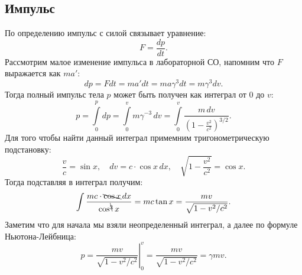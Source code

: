\subsection{Импульс}
По определению импульс с силой связывает уравнение:
\begin{equation*}
	F = \frac{dp}{dt}.
\end{equation*}
Рассмотрим малое изменение импульса в лабораторной СО, напомним что $F$ выражается как $ma'$:
\begin{equation*}
	dp = F dt = m a' dt = m a \gamma^{3} dt = m \gamma^{3} dv.
\end{equation*}
Тогда полный импульс тела $p$ может быть получен как интеграл от 0 до $v$:
\begin{equation*}
	p = \int\limits_0^{p} dp = \int\limits_0^{v} m \gamma^{-3} \,dv = \int\limits_0^{v} \frac{m \, dv}{\left(1 - \frac{v^2}{c^2}\right)^{3/2}}.
\end{equation*}
Для того чтобы найти данный интеграл примемним тригонометрическую подстановку:
\begin{equation}
	\frac{v}{c} = \sin x, \quad dv = c \cdot \cos x \, dx, \quad \sqrt{1-\frac{v^2}{c^2}} = \cos x.
	\label{eq:sr-imp-trigsub}
\end{equation}
Тогда подставляя в интеграл получим:
\begin{equation*}
	\int\limits \frac{mc \cdot \bcancel{\cos x} \, dx}{\cos^{\bcancel{3}} x} = mc \tan x = \frac{mv}{\sqrt{1-v^2/c^2}}.
\end{equation*}
Заметим что для начала мы взяли неопределенный интеграл, а далее по формуле Ньютона-Лейбница:
\begin{equation*}
	p=\left.\frac{m v}{\sqrt{1-v^2 / c^2}}\right|_0 ^v = \frac{mv}{\sqrt{1-v^2/c^2}} = \gamma m v.
\end{equation*}